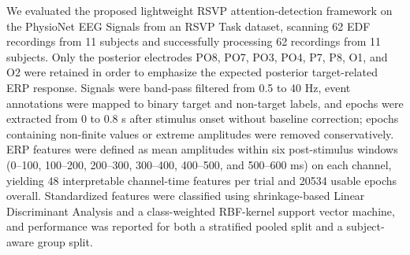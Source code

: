 We evaluated the proposed lightweight RSVP attention-detection framework on the PhysioNet EEG Signals from an RSVP Task dataset, scanning 62 EDF recordings from 11 subjects and successfully processing 62 recordings from 11 subjects. Only the posterior electrodes PO8, PO7, PO3, PO4, P7, P8, O1, and O2 were retained in order to emphasize the expected posterior target-related ERP response. Signals were band-pass filtered from 0.5 to 40 Hz, event annotations were mapped to binary target and non-target labels, and epochs were extracted from 0 to 0.8 s after stimulus onset without baseline correction; epochs containing non-finite values or extreme amplitudes were removed conservatively. ERP features were defined as mean amplitudes within six post-stimulus windows (0--100, 100--200, 200--300, 300--400, 400--500, and 500--600 ms) on each channel, yielding 48 interpretable channel-time features per trial and 20534 usable epochs overall. Standardized features were classified using shrinkage-based Linear Discriminant Analysis and a class-weighted RBF-kernel support vector machine, and performance was reported for both a stratified pooled split and a subject-aware group split.
